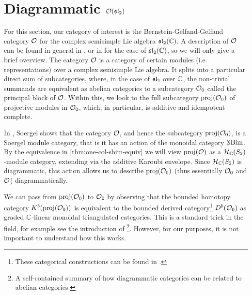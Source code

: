 \section{Diagrammatic \texorpdfstring{$\mathcal{O}(\operatorname{\mathfrak{sl}}_2)$}{O(sl2)}}
\label{sec:diag-osl2}

For this section, our category of interest is the Bernstein-Gelfand-Gelfand category $\mathcal{O}$ for the complex semisimple Lie algebra $\operatorname{\mathfrak{sl}}_2(\mathbb{C})$. A description of $\mathcal{O}$ can be found in general in {\cite[Sections 3.8--3.10]{humphreys-category-O}}, or in {\cite[Section 5.2]{mazorchuk-lectures-sl2-modules}} for the case of $\operatorname{\mathfrak{sl}}_2(\mathbb{C})$, so we will only give a brief overview. The category $\mathcal{O}$ is a category of certain modules (i.e. representations) over a complex semisimple Lie algebra. It splits into a particular direct sum of subcategories, where, in the case of $\operatorname{\mathfrak{sl}}_2$ over $\mathbb{C}$, the non-trivial summands are equivalent as abelian categories to a subcategory $\mathcal{O}_0$ called the principal block of $\mathcal{O}$. Within this, we look to the full subcategory $\operatorname{proj}(\mathcal{O}_0)$ of projective modules in $\mathcal{O}_0$, which, in particular, is additive and idempotent complete.

In \cite[Section 2.4]{soergel-category-O}, Soergel shows that the category $\mathcal{O}$, and hence the subcategory $\operatorname{proj}(\mathcal{O}_0)$, is a Soergel module category, that is it has an action of the monoidal category $\operatorname{\mathbb{S}Bim}$. By the equivalence in \autoref{thm:one-col-sbim-equiv} we will view $\operatorname{proj}(\mathcal{O})$ as a $\mathcal{H}_{\mathbb{C}}(S_2)$-module category, extending via the additive Karoubi envelope. Since $\mathcal{H}_{\mathbb{C}}(S_2)$ is diagrammatic, this action allows us to describe $\operatorname{proj}(\mathcal{O}_0)$ (thus essentially $\mathcal{O}_0$ and $\mathcal{O}$) diagrammatically.

\begin{remark}
    \label{rk:projO_0-to-O_0}
    We can pass from $\operatorname{proj}(\mathcal{O}_0)$ to $\mathcal{O}_0$ by observing that the bounded homotopy category $K^b(\operatorname{proj}(\mathcal{O}_0))$ is equivalent to the bounded derived category\footnote{These categorical constructions can be found in \cite{weibel-homological-algebra}.} $D^b(\mathcal{O}_0)$ as graded $\mathbb{C}$-linear monoidal triangulated categories. This is a standard trick in the field, for example see the introduction of \cite{riche-williamson-tilt-modules-p-canon-basis}\footnote{A self-contained summary of how diagrammatic categories can be related to abelian categories.}. However, for our purposes, it is not important to understand how this works.
\end{remark}

